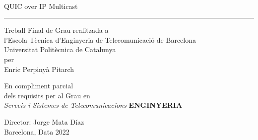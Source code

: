 {
        \fancyhf{}\renewcommand{\headrulewidth}{0pt}
    }

    \thispagestyle{empty}
    \begin{center}
    {\sffamily 
    \\
    \vspace{1cm}
    {\Huge QUIC over IP Multicast}\\
    \vspace{0.5cm}
    {\color{black}\hrule height 1pt}
    \vspace{1cm}
    {
        \large{Treball Final de Grau realitzada a\\
            l'Escola T\`ecnica d'Enginyeria de Telecomunicaci\'o de Barcelona \\
            Universitat Polit\`ecnica de Catalunya \\
            per\\
            \vspace{0.5cm} {\Huge{Enric Perpinyà Pitarch}}
        }
    }

    \vspace{1.5cm}

    {En compliment parcial\\
    dels requisits per al Grau en \\
    \textit{Serveis i Sistemes de Telecomunicacions} \textbf{ENGINYERIA}}

    \vspace{2cm}

    {Director: Jorge Mata Díaz\\}
    {Barcelona, Data 2022}

    \vspace{2cm}

    \thispagestyle{alim}
}

\end{center}
